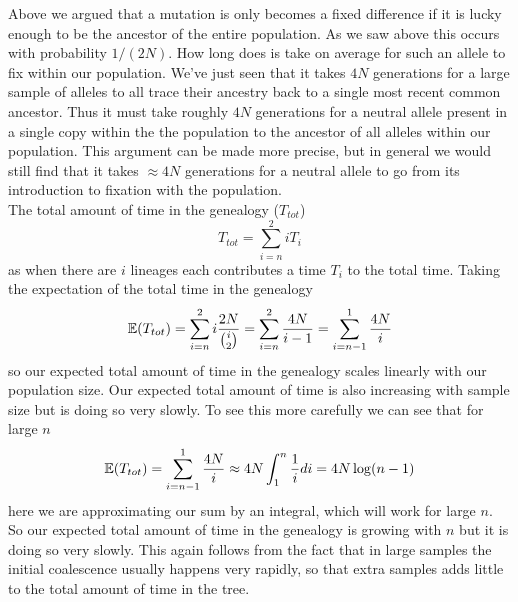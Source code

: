 Above we argued that a mutation is only becomes a fixed difference if
it is lucky enough to be the
ancestor of the entire population. As we saw above this occurs with
probability $1/(2N)$. How long does is take on average for such an
allele to fix within our population. We've just seen that it
takes $4N$ generations for a large sample of alleles to all trace
their ancestry back to a single most recent common
ancestor. Thus it must take roughly $4N$ generations for a neutral
allele present in a single copy within the the population to the
ancestor of all alleles within our population. This argument can be
made more precise, but in general we would still find that it takes
$\approx 4N$ generations for a neutral allele to go from its
introduction to fixation with the population.   \\




The total amount of time in the genealogy ($T_{tot}$)
\begin{equation}
T_{tot} = \sum_{i=n}^2 iT_i
\end{equation}
as when there are $i$ lineages each contributes a time $T_i$ to the
total time. Taking the expectation of the total time in the genealogy
\begin{equation}
\mathbb{E}(T_{tot}) = \sum_{i=n}^2 i \frac{2N}{{i \choose
 2} } = \sum_{i=n}^2 \frac{4N}{i -1} =\sum_{i=n-1}^1 \frac{4N}{i}
\end{equation}
so our expected total amount of time in the genealogy scales linearly
with our population size. Our expected total amount of time is also
increasing with sample size but is doing so very slowly. To see this
more carefully we can see that for large $n$
\begin{equation}
\mathbb{E}(T_{tot}) = \sum_{i=n-1}^1 \frac{4N}{i} \approx 4N \int_1^n \frac{1}{i} di
= 4N \log(n-1)
\end{equation}
here we are approximating our sum by an integral, which will work for
large $n$. So our expected total amount of time in the genealogy
is growing with $n$ but it is doing so very slowly. This again follows
from the fact that in large samples the initial coalescence usually
happens very rapidly, so that extra samples adds little to the total
amount of time in the tree. \\


